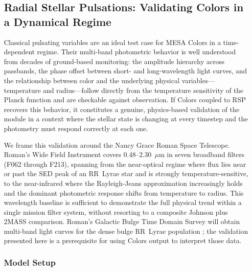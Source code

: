 \documentclass[linenumbers,apj,twocolumn, floatfix]{aastex701}
\begin{document}

\subsection{Radial Stellar Pulsations: Validating Colors in a Dynamical Regime}
\label{sec:demo_rsp}

Classical pulsating variables are an ideal test case for MESA Colors in a time-dependent regime.
Their multi-band photometric behavior is well understood from decades of ground-based monitoring: the amplitude hierarchy across passbands, the phase offset between short- and long-wavelength light curves, and the relationship between color and the underlying physical variables—temperature and radius—follow directly from the temperature sensitivity of the Planck function and are checkable against observation.
If Colors coupled to RSP recovers this behavior, it constitutes a genuine, physics-based validation of the module in a context where the stellar state is changing at every timestep and the photometry must respond correctly at each one.

We frame this validation around the Nancy Grace Roman Space Telescope.
Roman's Wide Field Instrument covers 0.48--2.30~$\mu$m in seven broadband filters (F062 through F213), spanning from the near-optical regime where flux lies near or past the SED peak of an RR~Lyrae star and is strongly temperature-sensitive, to the near-infrared where the Rayleigh-Jeans approximation increasingly holds and the dominant photometric response shifts from temperature to radius.
This wavelength baseline is sufficient to demonstrate the full physical trend within a single mission filter system, without resorting to a composite Johnson plus 2MASS comparison.
Roman's Galactic Bulge Time Domain Survey will obtain multi-band light curves for the dense bulge RR~Lyrae population \citep{roman}; the validation presented here is a prerequisite for using Colors output to interpret those data.

\subsubsection{Model Setup}
\label{sec:rsp_setup}
\end{document}
